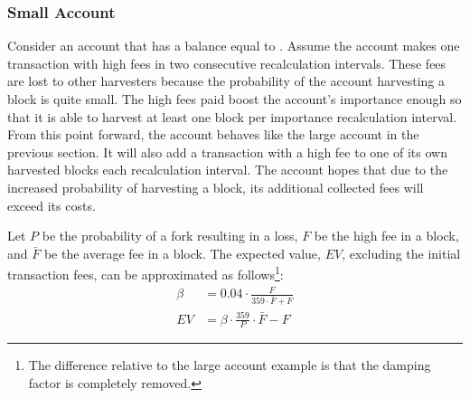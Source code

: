 \subsubsection*{Small Account}

Consider an account that has a balance equal to .
Assume the account makes one transaction with high fees in two consecutive recalculation intervals.
These fees are lost to other harvesters because the probability of the account harvesting a block is quite small.
The high fees paid boost the account’s importance enough so that it is able to harvest at least one block per importance recalculation interval.
From this point forward, the account behaves like the large account in the previous section.
It will also add a transaction with a high fee to one of its own harvested blocks each recalculation interval.
The account hopes that due to the increased probability of harvesting a block, its additional collected fees will exceed its costs.

\begin{figure}[H]
\end{figure}

Let $P$ be the probability of a fork resulting in a loss, $F$ be the high fee in a block, and $\bar{F}$ be the average fee in a block.
The expected value, $EV$, excluding the initial transaction fees, can be approximated as follows\footnote{
The difference relative to the large account example is that the damping factor is completely removed.}:
\begin{align*}
	\tag{importance boost}\beta &= 0.04 \cdot \frac{F}{359 \cdot \bar{F} + F} \\
	\tag{expected value} EV &= \beta \cdot \frac{359}{P} \cdot \bar{F} - F
\end{align*}

